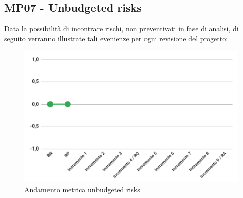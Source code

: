 \subsection{MP07 - Unbudgeted risks}
Data la possibilità di incontrare rischi, non preventivati in fase di analisi, di seguito verranno illustrate tali evenienze per ogni revisione del progetto:
\begin{figure}[H]
	\centering
	\includegraphics[width=12cm]{images/unbudgeted_risks.png}
	\caption{Andamento metrica unbudgeted risks}
\end{figure}


